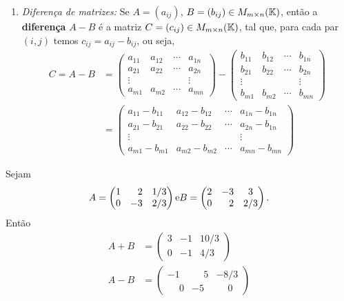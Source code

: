 \begin{enumerate}
    \item \textit{Diferença de matrizes:} Se $A = (a_{ij})$, $B = (b_{ij}) \in M_{m\times n}(\mathbb{K})$, ent\~ao a
        \textbf{diferença} $A - B$ \'e a matriz $C = (c_{ij}) \in M_{m\times n}(\mathbb{K})$, tal que, para cada par $(i,j)$ temos $c_{ij} =
        a_{ij} - b_{ij}$, ou seja,
	\begin{align*}
		C = A - B &= \begin{pmatrix}
		a_{11} & a_{12} & \cdots & a_{1n}\\
		a_{21} & a_{22} & \cdots & a_{2n}\\
		\vdots & & & \vdots\\
		a_{m1} & a_{m2} & \cdots & a_{mn}
	\end{pmatrix} - \begin{pmatrix}
		b_{11} & b_{12} & \cdots & b_{1n}\\
		b_{21} & b_{22} & \cdots & b_{2n}\\
		\vdots & & & \vdots\\
		b_{m1} & b_{m2} & \cdots & b_{mn}
	\end{pmatrix}\\ &= \begin{pmatrix}
		a_{11} - b_{11} & a_{12} - b_{12} & \cdots & a_{1n} - b_{1n}\\
		a_{21} - b_{21} & a_{22} - b_{22}& \cdots & a_{2n} - b_{1n}\\
		\vdots & & & \vdots\\
		a_{m1} - b_{m1} & a_{m2} - b_{m2}& \cdots & a_{mn} - b_{mn}
	\end{pmatrix}
	\end{align*}
\end{enumerate}

\begin{exemplo}
    Sejam
    \[
        A = \begin{pmatrix}1 & \phantom{-}2 & 1/3\\0 & -3 & 2/3\end{pmatrix}\\
        \mbox{e}\\
        B = \begin{pmatrix}2 & -3 & 3\\0 & \phantom{-}2 & 2/3\end{pmatrix}.
    \]
    Então
    \begin{align*}
        A + B &= \begin{pmatrix} 3 & -1 & 10/3\\0 & -1 & 4/3\end{pmatrix}\\
        A - B &= \begin{pmatrix} -1 & \phantom{-}5 & -8/3\\ \phantom{-}0 & -5 & \phantom{-}0\end{pmatrix}
    \end{align*}
\end{exemplo}

